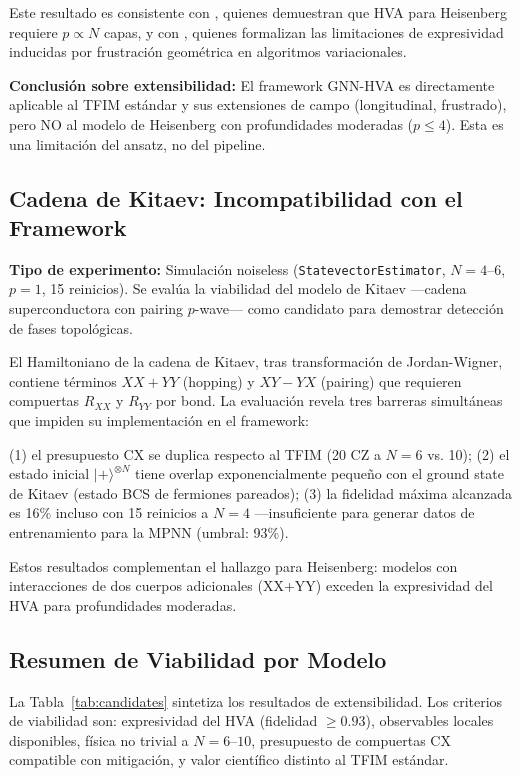 \documentclass[11pt,a4paper,spanish]{book}
\begin{document}
Este resultado es consistente con \citet{wiersema2020}, quienes demuestran que HVA para Heisenberg requiere $p \propto N$ capas, y con \citet{huang2026frustration}, quienes formalizan las limitaciones de expresividad inducidas por frustración geométrica en algoritmos variacionales.

\textbf{Conclusión sobre extensibilidad:} El framework GNN-HVA es directamente aplicable al TFIM estándar y sus extensiones de campo (longitudinal, frustrado), pero NO al modelo de Heisenberg con profundidades moderadas ($p \leq 4$). Esta es una limitación del ansatz, no del pipeline.

\subsection{Cadena de Kitaev: Incompatibilidad con el Framework}

\textbf{Tipo de experimento:} Simulación noiseless (\texttt{StatevectorEstimator}, $N = 4$--$6$, $p = 1$, 15 reinicios). Se evalúa la viabilidad del modelo de Kitaev ---cadena superconductora con pairing $p$-wave--- como candidato para demostrar detección de fases topológicas.

El Hamiltoniano de la cadena de Kitaev, tras transformación de Jordan-Wigner, contiene términos $XX + YY$ (hopping) y $XY - YX$ (pairing) que requieren compuertas $R_{XX}$ y $R_{YY}$ por bond. La evaluación revela tres barreras simultáneas que impiden su implementación en el framework:

(1) el presupuesto CX se duplica respecto al TFIM (20 CZ a $N=6$ vs. 10);
(2) el estado inicial $|+\rangle^{\otimes N}$ tiene overlap exponencialmente pequeño con el ground state de Kitaev (estado BCS de fermiones pareados);
(3) la fidelidad máxima alcanzada es 16\% incluso con 15 reinicios a $N = 4$ ---insuficiente para generar datos de entrenamiento para la MPNN (umbral: 93\%).

Estos resultados complementan el hallazgo para Heisenberg: modelos con interacciones de dos cuerpos adicionales (XX+YY) exceden la expresividad del HVA para profundidades moderadas.

\subsection{Resumen de Viabilidad por Modelo}

La Tabla~\ref{tab:candidates} sintetiza los resultados de extensibilidad. Los criterios de viabilidad son: expresividad del HVA (fidelidad $\geq 0.93$), observables locales disponibles, física no trivial a $N = 6$--$10$, presupuesto de compuertas CX compatible con mitigación, y valor científico distinto al TFIM estándar.
\end{document}
